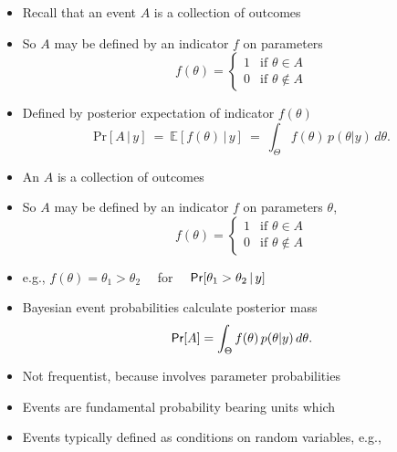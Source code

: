 \documentclass[10pt]{report}
\begin{document}
%
\begin{itemize}
\item Recall that an event $A$ is a collection of outcomes
\item So $A$ may be defined by an indicator $f$ on parameters
\[
f(\theta)
=
\begin{cases}
1 & \text{if } \theta \in A
\\
0 & \text{if } \theta \not\in A
\end{cases}
\]
\item Defined by posterior expectation of indicator $f(\theta)$
\[
\mathrm{Pr}[A \,|\, y]
\ = \
\mathbb{E}\left[ f(\theta) \, | \, y \right]
\ = \
\int_{\Theta} f(\theta) \, p(\theta|y) \, d\theta.
\]
\end{itemize}


%
\begin{itemize}
\item An  $A$ is a collection of outcomes
\item So $A$ may be defined by an indicator $f$ on parameters $\theta$,
\[
f(\theta)
=
\begin{cases}
1 & \text{if } \theta \in A
\\
0 & \text{if } \theta \not\in A
\end{cases}
\]
\item e.g., $f(\theta) = \theta_1 > \theta_2$
\ \ for \ \ $\text{\sf Pr}[\theta_1 > \theta_2 \, | \, y]$
\item Bayesian event probabilities calculate posterior mass
\[
\text{\sf Pr}[A] = \int_{\Theta} f(\theta) \, p(\theta|y) \, d\theta.
\]
\item Not frequentist, because involves parameter probabilities
\end{itemize}


%
\begin{itemize}
\item Events are fundamental probability bearing units which
\item Events typically defined as conditions on random variables, e.g.,
\end{itemize}
\end{document}
